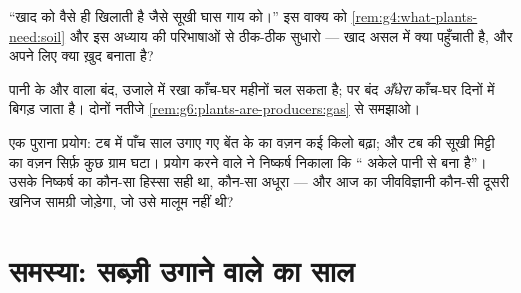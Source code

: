\begin{exercise}[$\star\star$]\label{exo:g6:plants-are-producers:10}
``खाद  को वैसे ही खिलाती है जैसे सूखी घास गाय को।'' इस वाक्य को
\cref{rem:g4:what-plants-need:soil} और इस अध्याय की परिभाषाओं से ठीक-ठीक
सुधारो --- खाद असल में क्या पहुँचाती है, और  अपने लिए क्या ख़ुद
बनाता है?
\end{exercise}

\begin{exercise}[$\star\star$]\label{exo:g6:plants-are-producers:11}
पानी के  और  वाला बंद, उजाले में रखा काँच-घर महीनों चल सकता
है; पर बंद \emph{अँधेरा} काँच-घर दिनों में बिगड़ जाता है। दोनों नतीजे
\cref{rem:g6:plants-are-producers:gas} से समझाओ।
\end{exercise}

\begin{exercise}[$\star\star\star$]\label{exo:g6:plants-are-producers:12}
एक पुराना प्रयोग: टब में पाँच साल उगाए गए बेंत के  का वज़न कई किलो
बढ़ा; और टब की सूखी मिट्टी का वज़न सिर्फ़ कुछ ग्राम घटा। प्रयोग करने
वाले ने निष्कर्ष निकाला कि `` अकेले पानी से बना है''। उसके निष्कर्ष
का कौन-सा हिस्सा सही था, कौन-सा अधूरा --- और आज का जीवविज्ञानी कौन-सी
दूसरी खनिज सामग्री जोड़ेगा, जो उसे मालूम नहीं थी?
\end{exercise}

\section{समस्या: सब्ज़ी उगाने वाले का साल}

